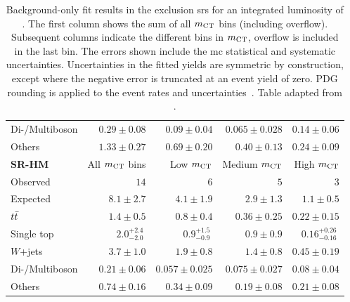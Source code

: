 \begin{table}
\begin{center}
{\begin{tabular}{lrrrr}
Di-/Multiboson          & $0.29 \pm 0.08$          & $0.09 \pm 0.04$          & $0.065 \pm 0.028$          & $0.14 \pm 0.06$              \\
Others          & $1.33 \pm 0.27$          & $0.69 \pm 0.20$          & $0.40 \pm 0.13$          & $0.24 \pm 0.09$              \\
\bottomrule
\textbf{ SR-HM}           & All $m_{\textrm{CT}}$ bins          & Low $m_{\textrm{CT}}$         & Medium $m_{\textrm{CT}}$        & High $m_{\textrm{CT}}$    \\[-0.05cm]
\midrule
Observed           & $14$              & $6$              & $5$              & $3$                    \\
\midrule
 Expected          & $8.1 \pm 2.7$          & $4.1 \pm 1.9$          & $2.9 \pm 1.3$          & $1.1 \pm 0.5$              \\
\midrule
         $t\bar{t}$          & $1.4 \pm 0.5$          & $0.8 \pm 0.4$          & $0.36 \pm 0.25$          & $0.22 \pm 0.15$              \\
Single top          & $2.0_{-2.0}^{+2.4}~$          & $0.9_{-0.9}^{+1.5}~$         & $0.9 \pm 0.9$          & $0.16_{-0.16}^{+0.26}~$              \\
$W$+jets           & $3.7 \pm 1.0$          & $1.9 \pm 0.8$          & $1.4 \pm 0.8$          & $0.45 \pm 0.19$              \\
Di-/Multiboson          & $0.21 \pm 0.06$          & $0.057 \pm 0.025$          & $0.075 \pm 0.027$          & $0.08 \pm 0.04$              \\
Others          & $0.74 \pm 0.16$          & $0.34 \pm 0.09$          & $0.19 \pm 0.08$          & $0.21 \pm 0.08$              \\
\bottomrule
\end{tabular}
}
\end{center}
\caption{ Background-only fit results in the exclusion \glspl{sr} for an integrated luminosity of \onethirtynineifb. The first column shows the sum of all $m_{\textrm{CT}}$ bins (including overflow). Subsequent columns indicate the different bins in $m_{\textrm{CT}}$, overflow is included in the last bin. The errors shown include the \gls{mc} statistical and systematic uncertainties. Uncertainties in the fitted yields are symmetric by construction, except where the negative error is truncated at an event yield of zero. PDG rounding is applied to the event rates and uncertainties~\cite{pdg2020}. Table adapted from \cite{SUSY-2019-08}.}\label{tab:results_bkg_only_SR}
\end{table}
%

